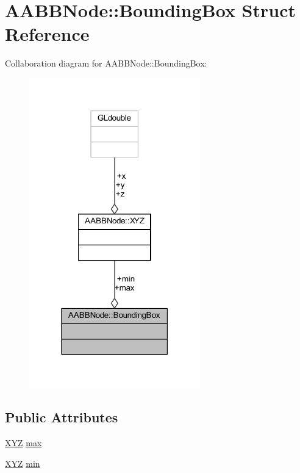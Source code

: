 \hypertarget{struct_a_a_b_b_node_1_1_bounding_box}{}\section{A\+A\+B\+B\+Node\+:\+:Bounding\+Box Struct Reference}
\label{struct_a_a_b_b_node_1_1_bounding_box}


Collaboration diagram for A\+A\+B\+B\+Node\+:\+:Bounding\+Box\+:
\nopagebreak
\begin{figure}[H]
\begin{center}
\leavevmode
\includegraphics[width=210pt]{struct_a_a_b_b_node_1_1_bounding_box__coll__graph}
\end{center}
\end{figure}
\subsection*{Public Attributes}
\begin{DoxyCompactItemize}
\item 
\hyperlink{struct_a_a_b_b_node_1_1_x_y_z}{X\+YZ} \hyperlink{struct_a_a_b_b_node_1_1_bounding_box_a75e2a4b821ffd9327092d1911fba647a}{max}
\item 
\hyperlink{struct_a_a_b_b_node_1_1_x_y_z}{X\+YZ} \hyperlink{struct_a_a_b_b_node_1_1_bounding_box_a9c046f23dd984b1bc04afe0257b68657}{min}
\end{DoxyCompactItemize}


